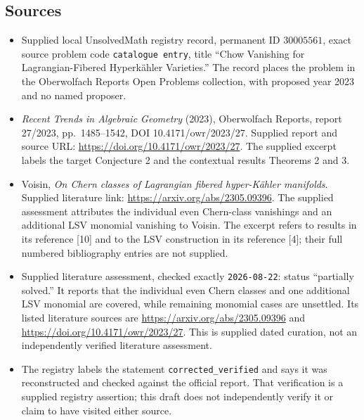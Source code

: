 \documentclass[11pt]{article}
\begin{document}
\subsection{Sources}
\begin{itemize}
\item Supplied local UnsolvedMath registry record, permanent ID \(30005561\), exact source problem code \texttt{catalogue entry}, title ``Chow Vanishing for Lagrangian-Fibered Hyperk\"ahler Varieties.'' The record places the problem in the Oberwolfach Reports Open Problems collection, with proposed year 2023 and no named proposer.
\item \emph{Recent Trends in Algebraic Geometry} (2023), Oberwolfach Reports, report 27/2023, pp.\ 1485--1542, DOI 10.4171/owr/2023/27. Supplied report and source URL: \url{https://doi.org/10.4171/owr/2023/27}. The supplied excerpt labels the target Conjecture 2 and the contextual results Theorems 2 and 3.
\item Voisin, \emph{On Chern classes of Lagrangian fibered hyper-K\"ahler manifolds}. Supplied literature link: \url{https://arxiv.org/abs/2305.09396}. The supplied assessment attributes the individual even Chern-class vanishings and an additional LSV monomial vanishing to Voisin. The excerpt refers to results in its reference [10] and to the LSV construction in its reference [4]; their full numbered bibliography entries are not supplied.
\item Supplied literature assessment, checked exactly \texttt{2026-08-22}: status ``partially solved.'' It reports that the individual even Chern classes and one additional LSV monomial are covered, while remaining monomial cases are unsettled. Its listed literature sources are \url{https://arxiv.org/abs/2305.09396} and \url{https://doi.org/10.4171/owr/2023/27}. This is supplied dated curation, not an independently verified literature assessment.
\item The registry labels the statement \texttt{corrected\_verified} and says it was reconstructed and checked against the official report. That verification is a supplied registry assertion; this draft does not independently verify it or claim to have visited either source.
\end{itemize}
\end{document}

